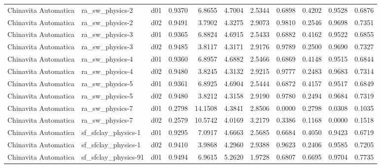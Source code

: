 \begin{longtable}{lllrrrrrrrr}
 Chinavita Automatica  &       ra\_sw\_physics-2 &     d01 &   0.9370 &   6.8655 &   4.7004 &       2.5344 &        0.6898 &       0.4202 &           0.9528 &  0.6876 \\
 Chinavita Automatica  &       ra\_sw\_physics-2 &     d02 &   0.9491 &   3.7902 &   4.3275 &       2.9073 &        0.9810 &       0.2546 &           0.9698 &  0.7351 \\
 Chinavita Automatica  &       ra\_sw\_physics-3 &     d01 &   0.9365 &   6.8824 &   4.6915 &       2.5433 &        0.6882 &       0.4162 &           0.9522 &  0.6855 \\
 Chinavita Automatica  &       ra\_sw\_physics-3 &     d02 &   0.9485 &   3.8117 &   4.3171 &       2.9176 &        0.9789 &       0.2500 &           0.9690 &  0.7327 \\
 Chinavita Automatica  &       ra\_sw\_physics-4 &     d01 &   0.9360 &   6.8957 &   4.6882 &       2.5466 &        0.6869 &       0.4148 &           0.9515 &  0.6844 \\
 Chinavita Automatica  &       ra\_sw\_physics-4 &     d02 &   0.9480 &   3.8245 &   4.3132 &       2.9215 &        0.9777 &       0.2483 &           0.9683 &  0.7314 \\
 Chinavita Automatica  &       ra\_sw\_physics-5 &     d01 &   0.9361 &   6.8925 &   4.6904 &       2.5444 &        0.6872 &       0.4157 &           0.9517 &  0.6849 \\
 Chinavita Automatica  &       ra\_sw\_physics-5 &     d02 &   0.9480 &   3.8212 &   4.3158 &       2.9190 &        0.9780 &       0.2494 &           0.9684 &  0.7319 \\
 Chinavita Automatica  &       ra\_sw\_physics-7 &     d01 &   0.2798 &  14.1508 &   4.3841 &       2.8506 &        0.0000 &       0.2798 &           0.0308 &  0.1035 \\
 Chinavita Automatica  &       ra\_sw\_physics-7 &     d02 &   0.2579 &  10.5742 &   4.0169 &       3.2179 &        0.3386 &       0.1168 &           0.0000 &  0.1518 \\
 Chinavita Automatica  &   sf\_sfclay\_physics-1 &     d01 &   0.9295 &   7.0917 &   4.6663 &       2.5685 &        0.6684 &       0.4050 &           0.9423 &  0.6719 \\
 Chinavita Automatica  &   sf\_sfclay\_physics-1 &     d02 &   0.9410 &   3.9868 &   4.2960 &       2.9388 &        0.9623 &       0.2406 &           0.9585 &  0.7205 \\
 Chinavita Automatica  &  sf\_sfclay\_physics-91 &     d01 &   0.9494 &   6.9615 &   5.2620 &       1.9728 &        0.6807 &       0.6695 &           0.9704 &  0.7735 \\

\end{longtable}
